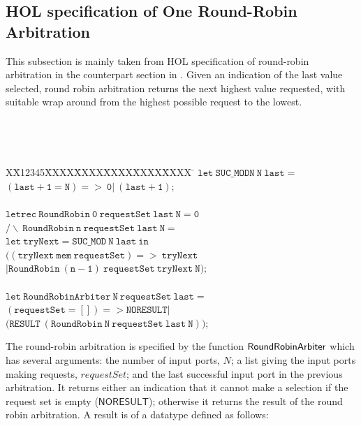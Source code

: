 \documentclass[final]{IEEEtran}
\newlength{\fminilength}
\newenvironment{fmini}[1][\linewidth]
  {\setlength{\fminilength}{#1\fboxsep-2\fboxrule}%
   \vspace{2ex}\noindent\begin{lrbox}{\fminibox}\begin{minipage}{\fminilength}%
   \mbox{ }\hfill\vspace{-2.5ex}}%
  {\end{minipage}\end{lrbox}\vspace{1ex}\hspace{0ex}%
   \framebox{\usebox{\fminibox}}}
\newenvironment{specification}
{\noindent\footnotesize\tt\begin{fmini}\begin{tabbing}X\=X12345\=XXXX\=XXXX\=XXXX\=XXXX\=XXXX
\=\+\kill} {\end{tabbing}\normalfont\end{fmini}}
\begin{document}
\subsection{HOL specification of One Round-Robin Arbitration}

This subsection is mainly taken from HOL specification of
round-robin arbitration in the counterpart section in \cite{Paul94}.
Given an indication of the last value selected, round robin
arbitration returns the next highest value requested, with suitable
wrap around from the highest possible request to the lowest.

\vspace{2mm}
\begin{specification}
$\mathtt{let\ SUC\_MODN\ N\ last=}$\\

\>$\mathtt{(last+1=N)=>\ 0|\ (last+1);}$\\
\\

$\mathtt{letrec\ RoundRobin\ 0\ requestSet\ last\ N=0}$\\

$\mathtt{/\backslash \ RoundRobin\ n\ requestSet\ last\ N=}$\\

\>$\mathtt{let\ tryNext=SUC\_MOD\ N\ last\ in}$\\

\>$\mathtt{((tryNext\ mem\ requestSet)=>\ tryNext}$\\

\>$\mathtt{|RoundRobin\ (n-1)\ requestSet\ tryNext \ N);}$\\

\\

$\mathtt{let\ RoundRobinArbiter\ N\ requestSet\ last=}$\\

\>$\mathtt{(requestSet=[])=>NORESULT|}$\\

\>$(\mathtt{RESULT\ (RoundRobin\ N\ requestSet\ last\ N));}$\\
\end{specification}

  The round-robin arbitration is specified by the function $\mathsf{%
RoundRobinArbiter}$ which has several arguments: the number of input ports, $%
N$; a list giving the input ports making requests, $requestSet$; and
the last successful input port in the previous arbitration. It
returns either an
indication that it cannot make a selection if the request set is empty ($%
\mathsf{NORESULT}$); otherwise it returns the result of the round robin
arbitration. A result is of a datatype defined as follows:
\end{document}
